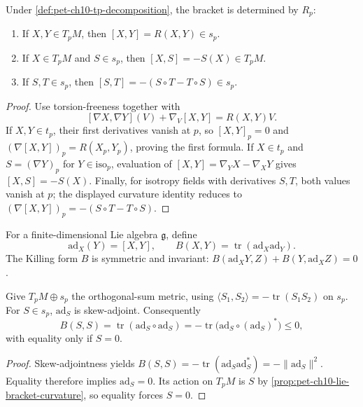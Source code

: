\begin{proposition}
  \label{prop:pet-ch10-lie-bracket-curvature}
  Under \cref{def:pet-ch10-tp-decomposition}, the bracket is determined by
  $R_p$:
  \begin{enumerate}
    \item If $X,Y\in T_pM$, then $[X,Y]=R(X,Y)\in s_p$.
    \item If $X\in T_pM$ and $S\in s_p$, then $[X,S]=-S(X)\in T_pM$.
    \item If $S,T\in s_p$, then $[S,T]=-(S\circ T-T\circ S)\in s_p$.
  \end{enumerate}
\end{proposition}
\begin{proof}
  \sketch
  Use torsion-freeness together with
  \[
    [\nabla X,\nabla Y](V)+\nabla_V[X,Y]=R(X,Y)V.
  \]
  If $X,Y\in t_p$, their first derivatives vanish at $p$, so $[X,Y]_p=0$
  and $(\nabla[X,Y])_p=R(X_p,Y_p)$, proving the first formula. If
  $X\in t_p$ and $S=(\nabla Y)_p$ for $Y\in\mathrm{iso}_p$, evaluation of
  $[X,Y]=\nabla_YX-\nabla_XY$ gives $[X,S]=-S(X)$. Finally, for isotropy
  fields with derivatives $S,T$, both values vanish at $p$; the displayed
  curvature identity reduces to $(\nabla[X,Y])_p=-(S\circ T-T\circ S)$.
\end{proof}

\begin{definition}
  \label{def:pet-ch10-killing-form}
  For a finite-dimensional Lie algebra $\mathfrak g$, define
  \[
    \mathrm{ad}_X(Y)=[X,Y],\qquad
    B(X,Y)=\operatorname{tr}(\mathrm{ad}_X\mathrm{ad}_Y).
  \]
  The Killing form $B$ is symmetric and invariant:
  $B(\mathrm{ad}_XY,Z)+B(Y,\mathrm{ad}_XZ)=0$.
\end{definition}

\begin{remark}
  \label{rem:pet-ch10-adjoint-skew-symmetric}
  Give $T_pM\oplus s_p$ the orthogonal-sum metric, using
  $\langle S_1,S_2\rangle=-\operatorname{tr}(S_1S_2)$ on $s_p$. For $S\in s_p$,
  $\mathrm{ad}_S$ is skew-adjoint. Consequently
  \[
    B(S,S)=\operatorname{tr}(\mathrm{ad}_S\circ\mathrm{ad}_S)=-\operatorname{tr}\big(\mathrm{ad}_S\circ(\mathrm{ad}_S)^*\big)\le0,
  \]
  with equality only if $S=0$.
\end{remark}
\begin{proof}
  \sketch
  Skew-adjointness yields
  $B(S,S)=-\operatorname{tr}(\mathrm{ad}_S\mathrm{ad}_S^*)=-\|\mathrm{ad}_S\|^2$.
  Equality therefore implies $\mathrm{ad}_S=0$. Its action on $T_pM$ is $S$
  by \cref{prop:pet-ch10-lie-bracket-curvature}, so equality forces $S=0$.
\end{proof}

